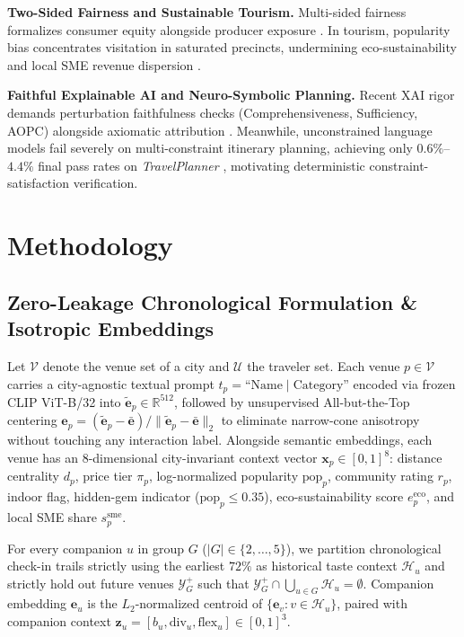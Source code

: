 \documentclass[preprint,12pt]{elsarticle}
\begin{document}
\textbf{Two-Sided Fairness and Sustainable Tourism.} Multi-sided fairness formalizes consumer equity alongside producer exposure \cite{burke2017multisided,patro2020fairrec}. In tourism, popularity bias concentrates visitation in saturated precincts, undermining eco-sustainability and local SME revenue dispersion \cite{chen2023bias}.

\textbf{Faithful Explainable AI and Neuro-Symbolic Planning.} Recent XAI rigor demands perturbation faithfulness checks (Comprehensiveness, Sufficiency, AOPC) alongside axiomatic attribution \cite{sundararajan2017axiomatic,deyoung2020eraser,lundberg2017unified}. Meanwhile, unconstrained language models fail severely on multi-constraint itinerary planning, achieving only $0.6\%$--$4.4\%$ final pass rates on \textit{TravelPlanner} \cite{xie2024travelplanner}, motivating deterministic constraint-satisfaction verification.

\section{Methodology}

\subsection{Zero-Leakage Chronological Formulation & Isotropic Embeddings}
Let $\mathcal{V}$ denote the venue set of a city and $\mathcal{U}$ the traveler set. Each venue $p \in \mathcal{V}$ carries a city-agnostic textual prompt $t_p = \text{``}\text{Name} \mid \text{Category}\text{''}$ encoded via frozen CLIP ViT-B/32 \cite{radford2021learning} into $\tilde{\mathbf{e}}_p \in \mathbb{R}^{512}$, followed by unsupervised All-but-the-Top centering \cite{mu2018all} $\mathbf{e}_p = (\tilde{\mathbf{e}}_p - \bar{\mathbf{e}}) / \|\tilde{\mathbf{e}}_p - \bar{\mathbf{e}}\|_2$ to eliminate narrow-cone anisotropy without touching any interaction label. Alongside semantic embeddings, each venue has an 8-dimensional city-invariant context vector $\mathbf{x}_p \in [0,1]^8$: distance centrality $d_p$, price tier $\pi_p$, log-normalized popularity $\text{pop}_p$, community rating $r_p$, indoor flag, hidden-gem indicator ($\text{pop}_p \le 0.35$), eco-sustainability score $e^{\text{eco}}_p$, and local SME share $s^{\text{sme}}_p$.

For every companion $u$ in group $G$ ($|G| \in \{2,\dots,5\}$), we partition chronological check-in trails strictly using the earliest $72\%$ as historical taste context $\mathcal{H}_u$ and strictly hold out future venues $\mathcal{Y}_G^+$ such that $\mathcal{Y}_G^+ \cap \bigcup_{u \in G} \mathcal{H}_u = \emptyset$. Companion embedding $\mathbf{e}_u$ is the $L_2$-normalized centroid of $\{\mathbf{e}_v : v \in \mathcal{H}_u\}$, paired with companion context $\mathbf{z}_u = [b_u, \text{div}_u, \text{flex}_u] \in [0,1]^3$.
\end{document}

